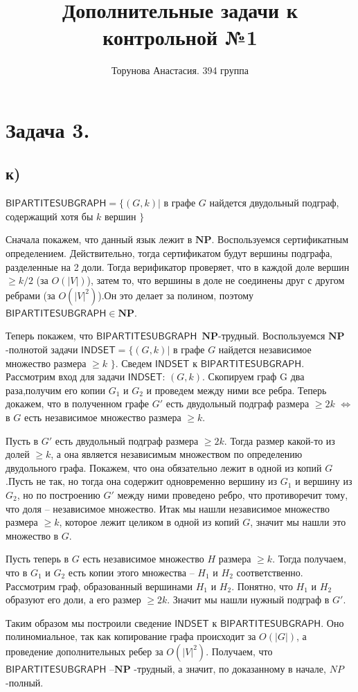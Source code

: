 \documentclass{article}
\title{Дополнительные задачи к контрольной №1}
\author{Торунова Анастасия. 394 группа}
\begin{document}
\maketitle
\section*{Задача 3.}
\subsection*{к)}
$\mathsf{BIPARTITESUBGRAPH}=\{ (G,k) |$ в графе $G$ найдется двудольный подграф, содержащий хотя бы $k$ вершин $ \} $

Сначала покажем, что данный язык лежит в $\mathbf{NP}$. Воспользуемся сертификатным определением. Действительно, тогда сертификатом будут вершины подграфа, разделенные на 2 доли. Тогда верификатор проверяет, что в каждой доле вершин $\geq k/2$ (за $O(|V|)$), затем то, что вершины в доле не соединены друг с другом ребрами (за $O(|V|^2)$).Он это делает за полином, поэтому $\mathsf{BIPARTITESUBGRAPH} \in \mathbf{NP}$.

Теперь покажем, что $\mathsf{BIPARTITESUBGRAPH}$\ $\mathbf{NP}$-трудный. Воспользуемся $\mathbf{NP}$-полнотой задачи $\mathsf{INDSET} =  \{ (G,k)|$ в графе $G$ найдется независимое множество размера $\geq k$ $\}$.
Сведем $\mathsf{INDSET}$ к $\mathsf{BIPARTITESUBGRAPH}$. Рассмотрим вход для задачи $\mathsf{INDSET}$: $(G,k)$.
Скопируем граф G два раза,получим его копии $G_1$ и $G_2$ и проведем между ними все ребра. Теперь докажем, что в полученном графе $G'$ есть двудольный подграф размера $\geq 2k$ $\Leftrightarrow$  в $G$ есть независимое множество размера $\geq k$.

Пусть в $G'$ есть двудольный подграф размера $\geq 2k$. Тогда размер какой-то  из долей $\geq k$, а она является независимым множеством по определению двудольного графа. Покажем, что она обязательно лежит в одной из копий $G$.Пусть не так, но тогда она содержит одновременно вершину из $G_1$ и вершину из $G_2$, но по построению $G'$ между ними проведено ребро, что противоречит тому, что доля -- независимое множество. Итак мы нашли независимое множество размера $\geq k$, которое лежит целиком в одной из копий $G$, значит мы нашли это множество в $G$.

Пусть теперь в $G$ есть независимое множество $H$ размера $\geq k$. Тогда получаем, что в $G_1$ и $G_2$ есть копии этого множества -- $H_1$ и $H_2$ соответственно. Рассмотрим граф, образованный вершинами $H_1$ и $H_2$. Понятно, что $H_1$ и $H_2$ образуют его доли, а его размер $\geq 2k$. Значит мы нашли нужный подграф в $G'$.

Таким образом мы построили сведение $\mathsf{INDSET}$ к $\mathsf{BIPARTITESUBGRAPH}$. Оно полиномиальное, так как копирование графа происходит за $O(|G|)$, а проведение дополнительных ребер за $O(|V|^2)$.
Получаем, что $\mathsf{BIPARTITESUBGRAPH}$ --$\mathbf{NP}$ -трудный, а значит, по доказанному в начале, $NP$-полный.
\end{document}
